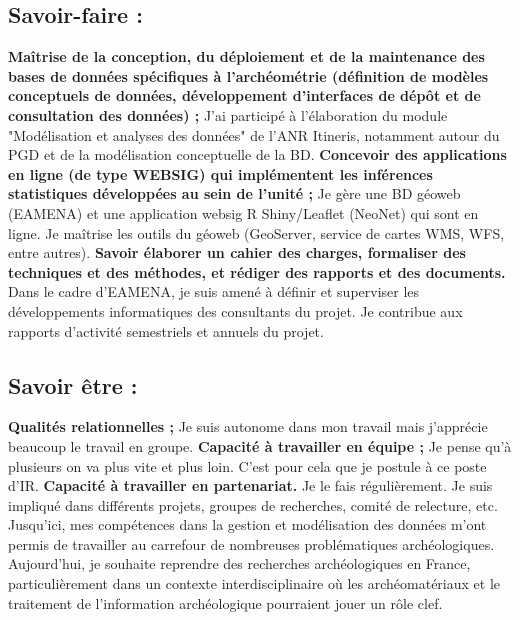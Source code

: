 \documentclass[12pt]{article}
\begin{document}
\subsection*{Savoir-faire :}

\textbf{Maîtrise de la conception, du déploiement et de la maintenance des bases de données spécifiques à
l'archéométrie (définition de modèles conceptuels de données, développement d'interfaces de dépôt et de
consultation des données) ;}
J'ai participé à l'élaboration du module "Modélisation et analyses des données" de l'ANR Itineris, notamment autour du
PGD et de la modélisation conceptuelle de la BD.
\smallbreak
\textbf{Concevoir des applications en ligne (de type WEBSIG) qui implémentent les inférences statistiques développées au
sein de l'unité ;}
Je gère une BD géoweb (EAMENA) et une application websig R Shiny/Leaflet (NeoNet) qui sont en ligne. Je maîtrise les
outils du géoweb (GeoServer, service de cartes WMS, WFS, entre autres).
\smallbreak
\textbf{Savoir élaborer un cahier des charges, formaliser des techniques et des méthodes, et rédiger des rapports et des
documents.}
Dans le cadre d'EAMENA, je suis amené à définir et superviser les développements informatiques des consultants du
projet. Je contribue aux rapports d'activité semestriels et annuels du projet.
\smallbreak
\subsection*{Savoir être :}
\textbf{Qualités relationnelles ;}
Je suis autonome dans mon travail mais j'apprécie beaucoup le travail en groupe.
\smallbreak
\textbf{Capacité à travailler en équipe ;}
Je pense qu'à plusieurs on va plus vite et plus loin. C'est pour cela que je postule à ce poste d'IR.
\smallbreak
\textbf{Capacité à travailler en partenariat.}
Je le fais régulièrement. Je suis impliqué dans différents projets, groupes de recherches, comité de relecture, etc.
\bigbreak
Jusqu'ici, mes compétences dans la gestion et modélisation des données m'ont permis de travailler au carrefour de
nombreuses problématiques archéologiques. Aujourd'hui, je souhaite reprendre des recherches archéologiques en
France, particulièrement dans un contexte interdisciplinaire où les archéomatériaux et le traitement de l'information
archéologique pourraient jouer un rôle clef.
\end{document}
